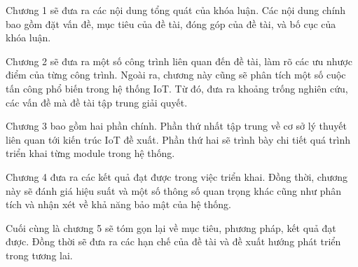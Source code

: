 Chương 1 sẽ đưa ra các nội dung tổng quát của khóa luận. Các nội dung chính 
bao gồm đặt vấn đề, mục tiêu của đề tài, đóng góp của đề tài, và bố cục của khóa luận.

Chương 2 sẽ đưa ra một số công trình liên quan đến đề tài, làm rõ các ưu nhược điểm của từng công trình.
Ngoài ra, chương này cũng sẽ phân tích một số cuộc tấn công phổ biến trong hệ thống IoT. Từ đó, đưa ra khoảng trống nghiên cứu, 
các vấn đề mà đề tài tập trung giải quyết.

Chương 3 bao gồm hai phần chính. Phần thứ nhất tập trung về cơ sở lý thuyết liên quan tới kiến trúc IoT đề xuất. Phần thứ hai sẽ trình bày
chi tiết quá trình triển khai từng module trong hệ thống.

Chương 4 đưa ra các kết quả đạt được trong việc triển khai. Đồng thời, chương này sẽ đánh giá hiệu suất và một số thông số quan trọng khác cũng như
phân tích và nhận xét về khả năng bảo mật của hệ thống.

Cuối cùng là chương 5 sẽ tóm gọn lại về mục tiêu, phương pháp, kết quả đạt được. Đồng thời sẽ đưa ra các hạn chế của đề tài và 
đề xuất hướng phát triển trong tương lai.


